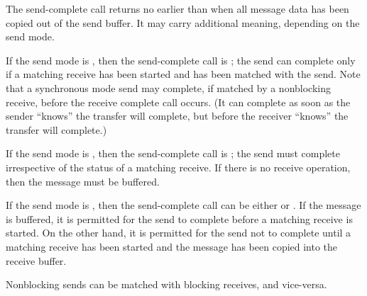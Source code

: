The send-complete call returns no earlier than when all message data has been copied out of the send buffer.
It may carry additional meaning, depending on the send mode.

If the send mode is ,
then the send-complete call is ;
the send can complete only if a matching receive has been started
and has been matched with the send.
Note that a synchronous mode send may complete,
if matched by a nonblocking receive,
before the receive complete call occurs.
(It can complete as soon as the sender ``knows'' the transfer will complete,
but before the receiver ``knows'' the transfer will complete.)

If the send mode is ,
then the send-complete call is ;
the send must complete irrespective of the status of a matching receive.
If there is no 
receive operation, then the message must be buffered.

If the send mode is ,
then the send-complete call can be either  or .
If the message is buffered, it is permitted for the send to complete
before a matching receive is started.
On the other hand, it is permitted for the send not to complete
until a matching receive has been started
and the message has been copied into the receive buffer.

Nonblocking sends can be matched with blocking receives, and
vice-versa.

